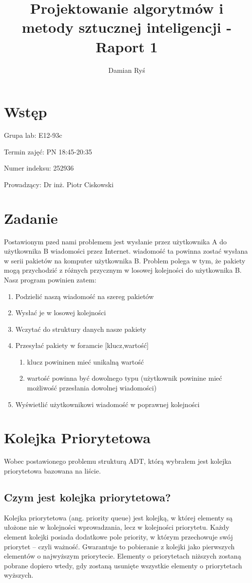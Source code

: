 \documentclass{article}
\title{Projektowanie algorytmów i metody sztucznej inteligencji - Raport 1}
\author{Damian Ryś}
\begin{document}
\maketitle


\tableofcontents
\section{Wstęp}
Grupa lab: E12-93c 

Termin zajęć: PN 18:45-20:35

Numer indeksu: 252936

Prowadzący: Dr inż. Piotr Ciskowski
\newpage
\section{Zadanie}
Postawionym pzed nami problemem jest wysłanie przez użytkownika A do użytkownika B wiadomości przez Internet.
wiadomość ta powinna zostać wysłana w serii pakietów na komputer użytkownika B.
Problem polega w tym, że pakiety mogą przychodzić z różnych przycznym w losowej kolejności do użytkownika B.
Nasz program powinien zatem:
\begin{enumerate}
    \item Podzielić naszą wiadomość na szereg pakietów
    \item Wysłać je w losowej kolejności
    \item Wczytać do struktury danych nasze pakiety
    \item Przesyłać pakiety w foramcie [klucz,wartość]
    \begin{enumerate}
        \item klucz powininen mieć unikalną wartość
        \item wartość powinna być dowolnego typu (użytkownik powinine mieć możliwość przesłania dowolnej wiadomości)
    \end{enumerate}
    \item Wyświetlić użytkownikowi wiadomość w poprawnej kolejności
\end{enumerate}
\section{Kolejka Priorytetowa}
Wobec postawionego problemu strukturą ADT, którą wybrałem jest kolejka priorytetowa bazowana na liście.
\subsection{Czym jest kolejka priorytetowa?}
Kolejka priorytetowa (ang. priority queue) jest kolejką, w której elementy są ułożone nie w kolejności wprowadzania, lecz w kolejności priorytetu.
Każdy element kolejki posiada dodatkowe pole priority, w którym przechowuje swój priorytet – czyli ważność.
Gwarantuje to pobieranie z kolejki jako pierwszych elementów o najwyższym priorytecie. 
Elementy o priorytetach niższych zostaną pobrane dopiero wtedy, gdy zostaną usunięte wszystkie elementy o priorytetach wyższych.
\end{document}
